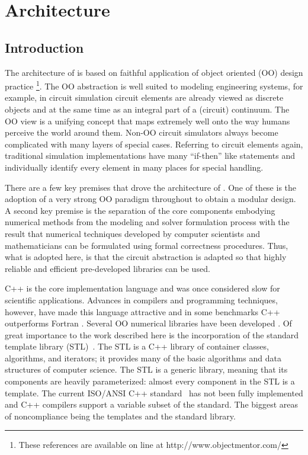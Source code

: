 \chapter{\FDA Architecture} \label{ch:oo}

\section{Introduction}

The architecture of \FDA is based on faithful application of object
oriented (OO) design practice\cite{eliens,dep_inv,open,liskov,int_seg,uml_tut}
\footnote{These references are available on line at http://www.objectmentor.com/}.
The OO abstraction is well suited to modeling engineering systems, for
example, in circuit simulation circuit elements are already viewed as discrete
objects and at the same time as an integral part of a (circuit) continuum.
The OO view is a unifying concept that maps extremely well onto the way
humans perceive the world around them.  Non-OO circuit simulators
always become complicated with many layers of special cases.
Referring to circuit elements again, traditional simulation
implementations have many ``if-then'' like statements and individually
identify every element in many places for special handling.

There are a few key premises that drove the architecture of \FDA. One of
these is the adoption of a very strong OO paradigm throughout to
obtain a modular design. A second key premise is the separation of the core
components embodying numerical methods from the modeling and solver
formulation process with the result that numerical techniques
developed by computer scientists and mathematicians can be formulated
using formal correctness procedures. Thus, what is adopted here, is
that the circuit abstraction is adapted so that highly reliable and
efficient pre-developed libraries can be used.

C++ is the core implementation language and was once considered slow
for scientific applications. Advances in compilers and programming
techniques, however, have made this language
attractive and in some benchmarks C++ outperforms Fortran
\cite{kai,c++fortran}. Several OO numerical libraries have been
developed \cite{oonpage}.  Of great importance to the work described
here is the incorporation of the standard template library
(STL)~\cite{STL}. The STL is a C++ library of container classes,
algorithms, and iterators; it provides many of the basic algorithms
and data structures of computer science. The STL is a generic library,
meaning that its components are heavily parameterized: almost every
component in the STL is a template.  The current ISO/ANSI C++
standard~\cite{todd} has not been fully implemented and C++ compilers
support a variable subset of the standard. The biggest areas of
noncompliance being the templates and the standard library.

